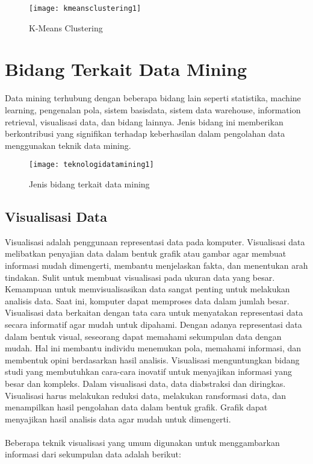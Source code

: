 \begin{figure}[H]
	\centering
	\texttt{[image: kmeansclustering1]}
	\caption{K-Means Clustering}
	\label{fig:rnaalgorithm}
\end{figure}


\section{Bidang Terkait Data Mining}
Data mining terhubung dengan beberapa bidang lain seperti statistika, machine learning, pengenalan pola, sistem basisdata, sistem data warehouse, information retrieval, visualisasi data, dan bidang lainnya. Jenis bidang ini memberikan berkontribusi yang signifikan terhadap keberhasilan dalam pengolahan data menggunakan teknik data mining.

\begin{figure}[H]
	\centering
	\texttt{[image: teknologidatamining1]}
	\caption{Jenis bidang terkait data mining}
	\label{fig:rnaalgorithm}
\end{figure}

\subsection{Visualisasi Data} 
Visualisasi adalah penggunaan representasi data pada komputer. Visualisasi data melibatkan penyajian data dalam bentuk grafik atau gambar agar membuat informasi mudah dimengerti, membantu menjelaskan fakta, dan menentukan arah tindakan. Sulit untuk membuat visualisasi pada ukuran data yang besar. Kemampuan untuk memvisualisasikan data sangat penting untuk melakukan analisis data. Saat ini, komputer dapat memproses data dalam jumlah besar. Visualisasi data berkaitan dengan tata cara untuk menyatakan representasi data secara informatif agar mudah untuk dipahami. Dengan adanya representasi data dalam bentuk visual, seseorang dapat memahami sekumpulan data dengan mudah. Hal ini membantu individu  menemukan pola, memahami informasi, dan membentuk opini berdasarkan hasil analisis. Visualisasi menguntungkan bidang studi yang membutuhkan cara-cara inovatif untuk menyajikan informasi yang besar dan kompleks. Dalam visualisasi data, data diabstraksi dan diringkas. Visualisasi harus melakukan reduksi data, melakukan ransformasi data, dan menampilkan hasil pengolahan data dalam bentuk grafik. Grafik dapat menyajikan hasil analisis data agar mudah untuk dimengerti.
\\\\
Beberapa teknik visualisasi yang umum digunakan untuk menggambarkan informasi dari sekumpulan data adalah berikut:

